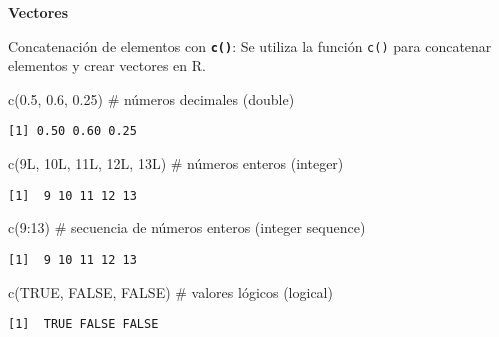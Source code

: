 \documentclass[
  a4paper,
]{article}
\newenvironment{Shaded}{}{}
\newcommand{\CommentTok}[1]{\textcolor[rgb]{0.42,0.45,0.49}{#1}}
\newcommand{\ConstantTok}[1]{\textcolor[rgb]{0.00,0.36,0.77}{#1}}
\newcommand{\DecValTok}[1]{\textcolor[rgb]{0.00,0.36,0.77}{#1}}
\newcommand{\FloatTok}[1]{\textcolor[rgb]{0.00,0.36,0.77}{#1}}
\newcommand{\FunctionTok}[1]{\textcolor[rgb]{0.44,0.26,0.76}{#1}}
\newcommand{\NormalTok}[1]{\textcolor[rgb]{0.14,0.16,0.18}{#1}}
\newcommand{\SpecialCharTok}[1]{\textcolor[rgb]{0.00,0.36,0.77}{#1}}
\begin{document}
\textbf{Vectores}

Concatenación de elementos con \textbf{\texttt{c()}}: Se utiliza la
función \texttt{c()} para concatenar elementos y crear vectores en R.

\begin{Shaded}
\begin{Highlighting}[]
\FunctionTok{c}\NormalTok{(}\FloatTok{0.5}\NormalTok{, }\FloatTok{0.6}\NormalTok{, }\FloatTok{0.25}\NormalTok{) }\CommentTok{\# números decimales (double)}
\end{Highlighting}
\end{Shaded}

\begin{verbatim}
[1] 0.50 0.60 0.25
\end{verbatim}

\begin{Shaded}
\begin{Highlighting}[]
\FunctionTok{c}\NormalTok{(}\DecValTok{9}\NormalTok{L, }\DecValTok{10}\NormalTok{L, }\DecValTok{11}\NormalTok{L, }\DecValTok{12}\NormalTok{L, }\DecValTok{13}\NormalTok{L) }\CommentTok{\# números enteros (integer)}
\end{Highlighting}
\end{Shaded}

\begin{verbatim}
[1]  9 10 11 12 13
\end{verbatim}

\begin{Shaded}
\begin{Highlighting}[]
\FunctionTok{c}\NormalTok{(}\DecValTok{9}\SpecialCharTok{:}\DecValTok{13}\NormalTok{) }\CommentTok{\# secuencia de números enteros (integer sequence)}
\end{Highlighting}
\end{Shaded}

\begin{verbatim}
[1]  9 10 11 12 13
\end{verbatim}

\begin{Shaded}
\begin{Highlighting}[]
\FunctionTok{c}\NormalTok{(}\ConstantTok{TRUE}\NormalTok{, }\ConstantTok{FALSE}\NormalTok{, }\ConstantTok{FALSE}\NormalTok{) }\CommentTok{\# valores lógicos (logical)}
\end{Highlighting}
\end{Shaded}

\begin{verbatim}
[1]  TRUE FALSE FALSE
\end{verbatim}
\end{document}
